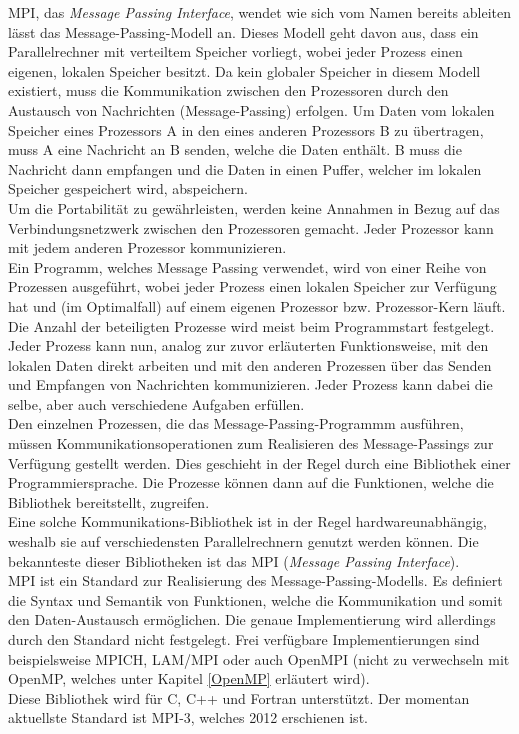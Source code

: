 			MPI, das \textit{Message Passing Interface}, wendet wie sich vom Namen bereits ableiten lässt das Message-Passing-Modell an. Dieses Modell geht davon aus, dass ein Parallelrechner mit verteiltem Speicher vorliegt, wobei jeder Prozess einen eigenen, lokalen Speicher besitzt. Da kein globaler Speicher in diesem Modell existiert, muss die Kommunikation zwischen den Prozessoren durch den Austausch von Nachrichten (Message-Passing) erfolgen. Um Daten vom lokalen Speicher eines Prozessors A in den eines anderen Prozessors B zu übertragen, muss A eine Nachricht an B senden, welche die Daten enthält. B muss die Nachricht dann empfangen und die Daten in einen Puffer, welcher im lokalen Speicher gespeichert wird, abspeichern.\\
			Um die Portabilität zu gewährleisten, werden keine Annahmen in Bezug auf das Verbindungsnetzwerk zwischen den Prozessoren gemacht. Jeder Prozessor kann mit jedem anderen Prozessor kommunizieren.\\
			Ein Programm, welches Message Passing verwendet, wird von einer Reihe von Prozessen ausgeführt, wobei jeder Prozess einen lokalen Speicher zur Verfügung hat und (im Optimalfall) auf einem eigenen Prozessor bzw. Prozessor-Kern läuft. Die Anzahl der beteiligten Prozesse wird meist beim Programmstart festgelegt. Jeder Prozess kann nun, analog zur zuvor erläuterten Funktionsweise, mit den lokalen Daten direkt arbeiten und mit den anderen Prozessen über das Senden und Empfangen von Nachrichten kommunizieren. Jeder Prozess kann dabei die selbe, aber auch verschiedene Aufgaben erfüllen.\\
			Den einzelnen Prozessen, die das Message-Passing-Programmm ausführen, müssen Kommunikationsoperationen zum Realisieren des Message-Passings zur Verfügung gestellt werden. Dies geschieht in der Regel durch eine Bibliothek einer Programmiersprache. Die Prozesse können dann auf die Funktionen, welche die Bibliothek bereitstellt, zugreifen.\\
			Eine solche Kommunikations-Bibliothek ist in der Regel hardwareunabhängig, weshalb sie auf verschiedensten Parallelrechnern genutzt werden können. Die bekannteste dieser Bibliotheken ist das MPI (\textit{Message Passing Interface}).\\
			MPI ist ein Standard zur Realisierung des Message-Passing-Modells. Es definiert die Syntax und Semantik von Funktionen, welche die Kommunikation und somit den Daten-Austausch ermöglichen. Die genaue Implementierung wird allerdings durch den Standard nicht festgelegt. Frei verfügbare Implementierungen sind beispielsweise MPICH, LAM/MPI oder auch OpenMPI (nicht zu verwechseln mit OpenMP, welches unter Kapitel \ref{OpenMP} erläutert wird).\\
			Diese Bibliothek wird für C, C++ und Fortran unterstützt. Der momentan aktuellste Standard ist MPI-3, welches 2012 erschienen ist. \cite{ParaProgRauber}
			
